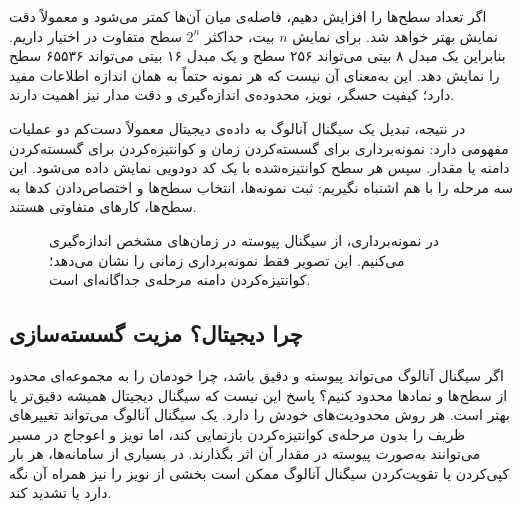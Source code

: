 اگر تعداد سطح‌ها را افزایش دهیم، فاصله‌ی میان آن‌ها کمتر می‌شود و معمولاً دقت نمایش بهتر خواهد شد. برای نمایش \(n\) بیت، حداکثر \(2^n\) سطح متفاوت در اختیار داریم. بنابراین یک مبدل ۸ بیتی می‌تواند ۲۵۶ سطح و یک مبدل ۱۶ بیتی می‌تواند ۶۵۵۳۶ سطح را نمایش دهد. این به‌معنای آن نیست که هر نمونه حتماً به همان اندازه اطلاعات مفید دارد؛ کیفیت حسگر، نویز، محدوده‌ی اندازه‌گیری و دقت مدار نیز اهمیت دارند.

در نتیجه، تبدیل یک سیگنال آنالوگ به داده‌ی دیجیتال معمولاً دست‌کم دو عملیات مفهومی دارد: نمونه‌برداری برای گسسته‌کردن زمان و کوانتیزه‌کردن برای گسسته‌کردن دامنه یا مقدار. سپس هر سطح کوانتیزه‌شده با یک کد دودویی نمایش داده می‌شود. این سه مرحله را با هم اشتباه نگیریم: ثبت نمونه‌ها، انتخاب سطح‌ها و اختصاص‌دادن کدها به سطح‌ها، کارهای متفاوتی هستند.

\begin{figure}[htbp]
\centering
{}
\caption{در نمونه‌برداری، از سیگنال پیوسته در زمان‌های مشخص اندازه‌گیری می‌کنیم. این تصویر فقط نمونه‌برداری زمانی را نشان می‌دهد؛ کوانتیزه‌کردن دامنه مرحله‌ی جداگانه‌ای است.}
\label{fig:sampling}
\end{figure}

\subsection{چرا دیجیتال؟ مزیت گسسته‌سازی}
\label{sub:why-digital}

اگر سیگنال آنالوگ می‌تواند پیوسته و دقیق باشد، چرا خودمان را به مجموعه‌ای محدود از سطح‌ها و نمادها محدود کنیم؟ پاسخ این نیست که سیگنال دیجیتال همیشه دقیق‌تر یا بهتر است. هر روش محدودیت‌های خودش را دارد. یک سیگنال آنالوگ می‌تواند تغییرهای ظریف را بدون مرحله‌ی کوانتیزه‌کردن بازنمایی کند، اما نویز و اعوجاج در مسیر می‌توانند به‌صورت پیوسته در مقدار آن اثر بگذارند. در بسیاری از سامانه‌ها، هر بار کپی‌کردن یا تقویت‌کردن سیگنال آنالوگ ممکن است بخشی از نویز را نیز همراه آن نگه دارد یا تشدید کند.

